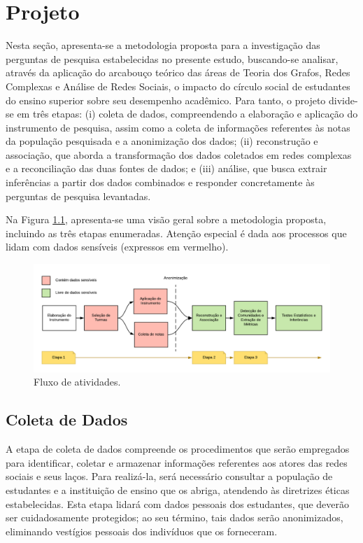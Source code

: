 \chapter{Projeto} \label{sec:project}

Nesta seção, apresenta-se a metodologia proposta para a investigação das perguntas de pesquisa estabelecidas no presente estudo, buscando-se analisar, através da aplicação do arcabouço teórico das áreas de Teoria dos Grafos, Redes Complexas e Análise de Redes Sociais, o impacto do círculo social de estudantes do ensino superior sobre seu desempenho acadêmico. Para tanto, o projeto divide-se em três etapas: (i) coleta de dados, compreendendo a elaboração e aplicação do instrumento de pesquisa, assim como a coleta de informações referentes às notas da população pesquisada e a anonimização dos dados; (ii) reconstrução e associação, que aborda a transformação dos dados coletados em redes complexas e a reconciliação das duas fontes de dados; e (iii) análise, que busca extrair inferências a partir dos dados combinados e responder concretamente às perguntas de pesquisa levantadas.

Na Figura \ref{fig:process}, apresenta-se uma visão geral sobre a metodologia proposta, incluindo as três etapas enumeradas. Atenção especial é dada aos processos que lidam com dados sensíveis (expressos em vermelho).

\begin{figure}[ht]
    \centering
    \includegraphics[width=\textwidth]{imagens/fluxo_ttc.png}
    \caption{Fluxo de atividades.}
    \label{fig:process}
\end{figure}

\section{Coleta de Dados} \label{sec:datacollection}

A etapa de coleta de dados compreende os procedimentos que serão empregados para identificar, coletar e armazenar informações referentes aos atores das redes sociais e seus laços. Para realizá-la, será necessário consultar a população de estudantes e a instituição de ensino que os abriga, atendendo às diretrizes éticas estabelecidas. Esta etapa lidará com dados pessoais dos estudantes, que deverão ser cuidadosamente protegidos; ao seu término, tais dados serão anonimizados, eliminando vestígios pessoais dos indivíduos que os forneceram.

